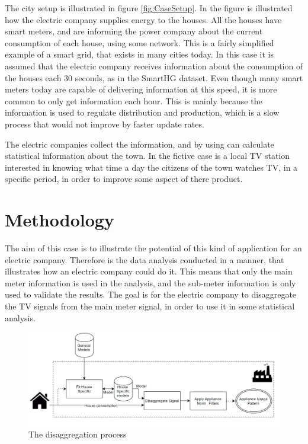 The city setup is illustrated in figure \ref{fig:CaseSetup}. In the figure is illustrated how the electric company supplies energy to the houses. All the houses have smart meters, and are informing the power company about the current consumption of each house, using some network. This is a fairly simplified example of a smart grid, that exists in many cities today. In this case it is assumed that the electric company receives information about the consumption of the houses each 30 seconds, as in the SmartHG dataset. Even though many smart meters today are capable of delivering information at this speed, it is more common to only get information each hour. This is mainly because the information is used to regulate distribution and production, which is a slow process that would not improve by faster update rates.  

The electric companies collect the information, and by using  can calculate statistical information about the town. In the fictive case is a local TV station interested in knowing what time a day the citizens of the town watches TV, in a specific period, in order to improve some aspect of there product. 

\section{Methodology}
The aim of this case is to illustrate the potential of this kind of application for an electric company. Therefore is the data analysis conducted in a manner, that illustrates how an electric company could do it. This means that only the main meter information is used in the analysis, and the sub-meter information is only used to validate the results.  The goal is for the electric company to disaggregate the TV signals from the main meter signal, in order to use it in some statistical analysis. 

\begin{figure}[H]
\centering
\includegraphics[width=1\textwidth]{billeder/Electric company method.png}
\caption{The disaggregation process}
\label{fig:ECM}
\end{figure}

